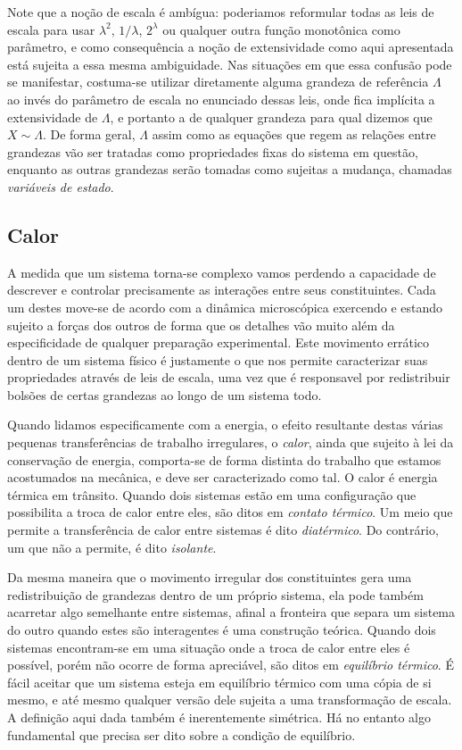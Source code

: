 \documentclass[a4paper, 12pt]{article}
\theoremstyle{definition}
\theoremstyle{definition}
\begin{document}
Note que a noção de escala é ambígua: poderiamos reformular todas as leis de escala para usar
$\lambda^2$, $1/\lambda$, $2^\lambda$ ou qualquer outra função monotônica como parâmetro, e como
consequência a noção de extensividade como aqui apresentada está sujeita a essa mesma ambiguidade.
Nas situações em que essa confusão pode se manifestar, costuma-se utilizar diretamente alguma 
grandeza de referência $\Lambda$ ao invés do parâmetro de escala no enunciado dessas leis, onde fica
implícita a extensividade de $\Lambda$, e portanto a de qualquer grandeza para qual dizemos que 
$X\sim\Lambda$. De forma geral, $\Lambda$ assim como as equações que regem as relações entre grandezas
vão ser tratadas como propriedades fixas do sistema em questão, enquanto as outras grandezas serão
tomadas como sujeitas a mudança, chamadas \textit{variáveis de estado}.

\subsection{Calor}

A medida que um sistema torna-se complexo vamos perdendo a capacidade de descrever e controlar 
precisamente as interações entre seus constituintes. Cada um destes move-se de acordo com a dinâmica
microscópica exercendo e estando sujeito a forças dos outros de forma que os detalhes vão muito
além da especificidade de qualquer preparação experimental. Este movimento errático dentro de um
sistema físico é justamente o que nos permite caracterizar suas propriedades através de leis de
escala, uma vez que é responsavel por redistribuir bolsões de certas grandezas ao longo de um
sistema todo.

Quando lidamos especificamente com a energia, o efeito resultante destas várias pequenas 
transferências de trabalho irregulares, o \textit{calor}, ainda que sujeito à lei da conservação de 
energia, comporta-se de forma distinta do trabalho que estamos acostumados na mecânica, e deve ser 
caracterizado como tal. O calor é energia térmica em trânsito. Quando dois sistemas estão em uma configuração
que possibilita a troca de calor entre eles, são ditos em \textit{contato térmico}. Um meio que 
permite a transferência de calor entre sistemas é dito \textit{diatérmico}. Do contrário, um 
que não a permite, é dito \textit{isolante}.

Da mesma maneira que o movimento irregular dos constituintes gera uma redistribuição de grandezas
dentro de um próprio sistema, ela pode também acarretar algo semelhante entre sistemas, afinal
a fronteira que separa um sistema do outro quando estes são interagentes é uma construção teórica.
Quando dois sistemas encontram-se em uma situação onde a troca de calor entre eles é possível,
porém não ocorre de forma apreciável, são ditos em \textit{equilíbrio térmico}. É fácil aceitar que
um sistema esteja em equilíbrio térmico com uma cópia de si mesmo, e até mesmo qualquer versão dele
sujeita a uma transformação de escala. A definição aqui dada também é inerentemente simétrica. Há
no entanto algo fundamental que precisa ser dito sobre a condição de equilíbrio.
\end{document}
